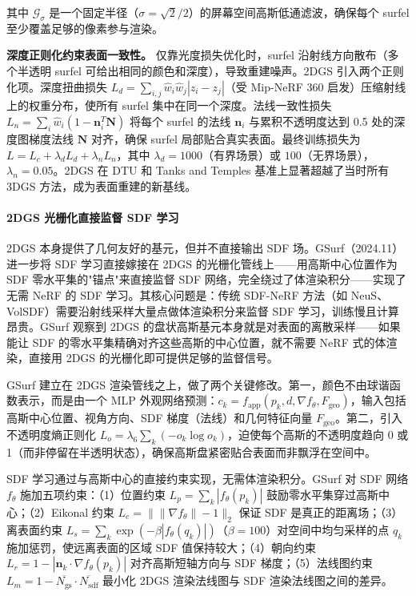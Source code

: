 其中 $\mathcal{G}_\sigma$ 是一个固定半径（$\sigma=\sqrt{2}/2$）的屏幕空间高斯低通滤波，确保每个 surfel 至少覆盖足够的像素参与渲染。

\textbf{深度正则化约束表面一致性。} 仅靠光度损失优化时，surfel 沿射线方向散布（多个半透明 surfel 可给出相同的颜色和深度），导致重建噪声。2DGS 引入两个正则化项。深度扭曲损失 $L_d=\sum_{i,j}\hat{w}_i\hat{w}_j|z_i-z_j|$（受 Mip-NeRF 360 启发）压缩射线上的权重分布，使所有 surfel 集中在同一个深度。法线一致性损失 $L_n=\sum_i\hat{w}_i(1-\mathbf{n}_i^T\mathbf{N})$ 将每个 surfel 的法线 $\mathbf{n}_i$ 与累积不透明度达到 0.5 处的深度图梯度法线 $\mathbf{N}$ 对齐，确保 surfel 局部贴合真实表面。最终训练损失为 $L=L_c+\lambda_d L_d+\lambda_n L_n$，其中 $\lambda_d=1000$（有界场景）或 $100$（无界场景），$\lambda_n=0.05$。2DGS 在 DTU 和 Tanks and Temples 基准上显著超越了当时所有 3DGS 方法，成为表面重建的新基线。

\paragraph{2DGS 光栅化直接监督 SDF 学习}

2DGS 本身提供了几何友好的基元，但并不直接输出 SDF 场。GSurf（2024.11）~\cite{2411_15723} 进一步将 SDF 学习直接嫁接在 2DGS 的光栅化管线上——用高斯中心位置作为 SDF 零水平集的"锚点"来直接监督 SDF 网络，完全绕过了体渲染积分——实现了无需 NeRF 的 SDF 学习。其核心问题是：传统 SDF-NeRF 方法（如 NeuS、VolSDF）需要沿射线采样大量点做体渲染积分来监督 SDF 学习，训练慢且计算昂贵。GSurf 观察到 2DGS 的盘状高斯基元本身就是对表面的离散采样——如果能让 SDF 的零水平集精确对齐这些高斯的中心位置，就不需要 NeRF 式的体渲染，直接用 2DGS 的光栅化即可提供足够的监督信号。

GSurf 建立在 2DGS 渲染管线之上，做了两个关键修改。第一，颜色不由球谐函数表示，而是由一个 MLP 外观网络预测：$c_k=f_\text{app}(p_k, d, \nabla f_\theta, F_\text{geo})$，输入包括高斯中心位置、视角方向、SDF 梯度（法线）和几何特征向量 $F_\text{geo}$。第二，引入不透明度熵正则化 $L_o=\lambda_6\sum_k(-o_k\log o_k)$，迫使每个高斯的不透明度趋向 0 或 1（而非停留在半透明状态），确保高斯盘紧密贴合表面而非飘浮在空间中。

SDF 学习通过与高斯中心的直接约束实现，无需体渲染积分。GSurf 对 SDF 网络 $f_\theta$ 施加五项约束：（1）位置约束 $L_p=\sum_k|f_\theta(p_k)|$ 鼓励零水平集穿过高斯中心；（2）Eikonal 约束 $L_e=\|\|\nabla f_\theta\|-1\|_2$ 保证 SDF 是真正的距离场；（3）离表面约束 $L_s=\sum_k\exp(-\beta|f_\theta(q_k)|)$（$\beta=100$）对空间中均匀采样的点 $q_k$ 施加惩罚，使远离表面的区域 SDF 值保持较大；（4）朝向约束 $L_r=1-|\mathbf{n}_k \cdot \nabla f_\theta(p_k)|$ 对齐高斯短轴方向与 SDF 梯度；（5）法线图约束 $L_m=1-\overline{N_\text{gs}} \cdot \overline{N_\text{sdf}}$ 最小化 2DGS 渲染法线图与 SDF 渲染法线图之间的差异。

